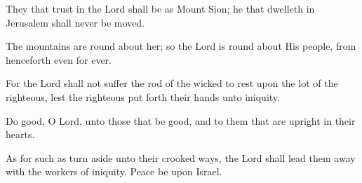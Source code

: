 They that trust in the Lord shall be as Mount Sion; he that dwelleth in Jerusalem shall never be moved.

The mountains are round about her; so the Lord is round about His people, from henceforth even for ever.

For the Lord shall not suffer the rod of the wicked to rest upon the lot of the righteous, lest the righteous put forth their hands unto iniquity.

Do good, O Lord, unto those that be good, and to them that are upright in their hearts.

As for such as turn aside unto their crooked ways, the Lord shall lead them away with the workers of iniquity. Peace be upon Israel.
